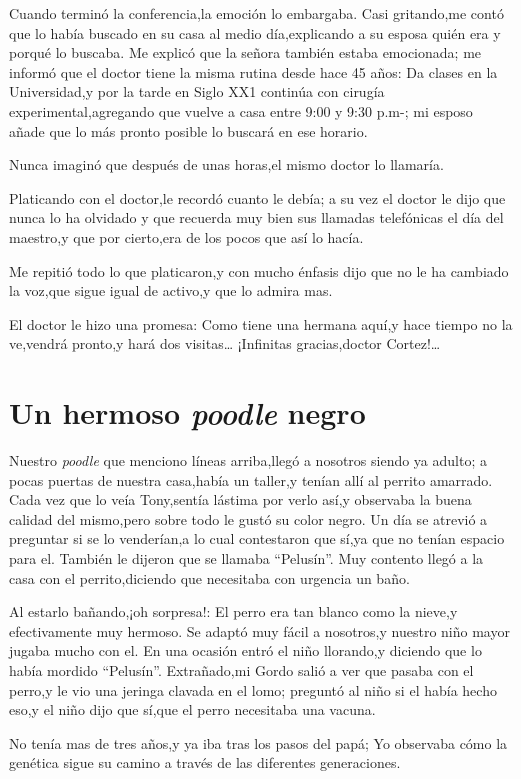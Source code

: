 \documentclass[letterpaper,12pt]{book}
\begin{document}
Cuando terminó la conferencia,la emoción lo embargaba. Casi gritando,me contó que lo había buscado en su casa al medio día,explicando a su esposa quién era y porqué lo buscaba. Me explicó que la señora también estaba emocionada; me informó que el doctor tiene la misma rutina desde hace 45 años: Da clases en la Universidad,y por la tarde en Siglo XX1 continúa con cirugía experimental,agregando que vuelve a casa entre 9:00 y 9:30 p.m-; mi esposo añade que lo más pronto posible lo buscará en ese horario.

Nunca imaginó que después de unas horas,el mismo doctor lo llamaría.

Platicando con el doctor,le recordó cuanto le debía; a su vez el doctor le dijo que nunca lo ha olvidado y que recuerda muy bien sus llamadas telefónicas el día del maestro,y que por cierto,era de los pocos que así lo hacía.

Me repitió todo lo que platicaron,y con mucho énfasis dijo que no le ha cambiado la voz,que sigue igual de activo,y que lo admira mas.

El doctor le hizo una promesa: Como tiene una hermana aquí,y hace tiempo no la ve,vendrá pronto,y hará dos visitas\ldots
¡Infinitas gracias,doctor Cortez!\ldots
\chapter{Un hermoso \textit{poodle} negro}
Nuestro \textit{poodle} que menciono líneas arriba,llegó a nosotros siendo ya adulto; a pocas puertas de nuestra casa,había un taller,y tenían allí al perrito amarrado. Cada vez que lo veía Tony,sentía lástima por verlo así,y observaba la buena calidad del mismo,pero sobre todo le gustó su color negro. Un día se atrevió a preguntar si se lo venderían,a lo cual contestaron que sí,ya que no tenían espacio para el. También le dijeron que se llamaba ``Pelusín''. Muy contento llegó a la casa con el perrito,diciendo que necesitaba con urgencia un baño.

Al estarlo bañando,¡oh sorpresa!: El perro era tan blanco como la nieve,y efectivamente muy hermoso. Se adaptó muy fácil a nosotros,y nuestro niño mayor  jugaba mucho con el. En una ocasión entró el niño llorando,y diciendo que lo había mordido ``Pelusín''. Extrañado,mi Gordo salió a ver que pasaba con el perro,y le vio una jeringa clavada en el lomo; preguntó al niño si el había hecho eso,y el niño dijo que sí,que el perro necesitaba una vacuna.

No tenía mas de tres años,y ya iba tras los pasos del papá; Yo observaba cómo la genética sigue su camino a través de las diferentes generaciones.
\end{document}
